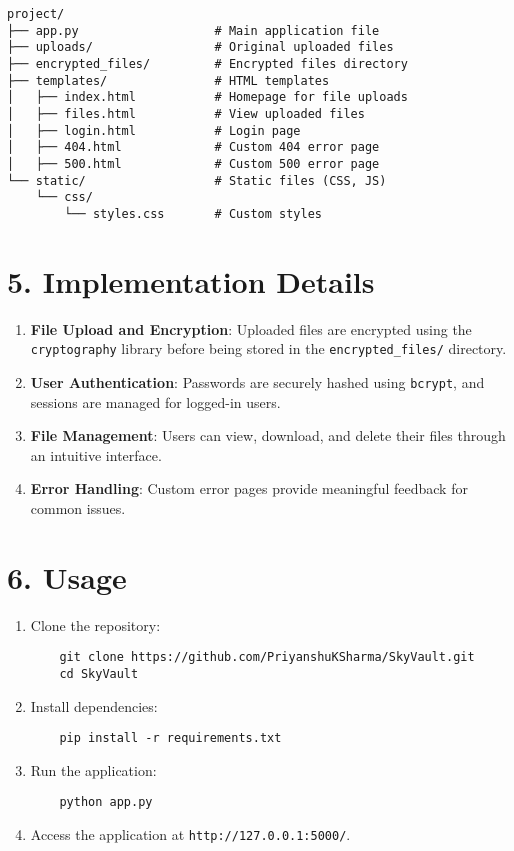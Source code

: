 \documentclass[12pt,a4paper]{article}
\begin{document}
\begin{tcolorbox}[colback=blue!5!white, colframe=blue!75!black, sharp corners, boxrule=0.5mm]
\begin{Verbatim}
project/
├── app.py                   # Main application file
├── uploads/                 # Original uploaded files
├── encrypted_files/         # Encrypted files directory
├── templates/               # HTML templates
│   ├── index.html           # Homepage for file uploads
│   ├── files.html           # View uploaded files
│   ├── login.html           # Login page
│   ├── 404.html             # Custom 404 error page
│   ├── 500.html             # Custom 500 error page
└── static/                  # Static files (CSS, JS)
    └── css/
        └── styles.css       # Custom styles
\end{Verbatim}
\end{tcolorbox}

\section*{5. Implementation Details}
\begin{enumerate}[label=\arabic*.]
    \item \textbf{File Upload and Encryption}:
    Uploaded files are encrypted using the \texttt{cryptography} library before being stored in the \texttt{encrypted\_files/} directory.
    \item \textbf{User Authentication}:
    Passwords are securely hashed using \texttt{bcrypt}, and sessions are managed for logged-in users.
    \item \textbf{File Management}:
    Users can view, download, and delete their files through an intuitive interface.
    \item \textbf{Error Handling}:
    Custom error pages provide meaningful feedback for common issues.
\end{enumerate}

\section*{6. Usage}
\begin{tcolorbox}[colback=gray!5!white, colframe=gray!75!black, sharp corners, boxrule=0.5mm]
\begin{enumerate}
    \item Clone the repository:
    \begin{Verbatim}
    git clone https://github.com/PriyanshuKSharma/SkyVault.git
    cd SkyVault
    \end{Verbatim}
    \item Install dependencies:
    \begin{Verbatim}
    pip install -r requirements.txt
    \end{Verbatim}
    \item Run the application:
    \begin{Verbatim}
    python app.py
    \end{Verbatim}
    \item Access the application at \texttt{http://127.0.0.1:5000/}.
\end{enumerate}
\end{tcolorbox}
\end{document}
